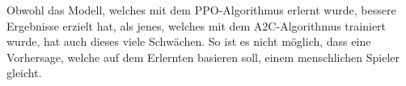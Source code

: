 Obwohl das Modell, welches mit dem PPO-Algorithmus erlernt wurde,
bessere Ergebnisse erzielt hat, als jenes, welches mit dem A2C-Algorithmus trainiert wurde,
hat auch dieses viele Schwächen. So ist es nicht möglich, dass eine Vorhersage, welche
auf dem Erlernten basieren soll, einem menschlichen Spieler gleicht.



